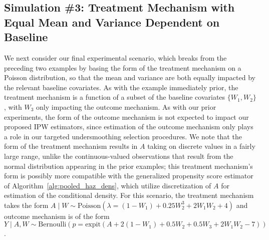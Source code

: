 \subsection{Simulation \#3: Treatment Mechanism with Equal Mean and Variance
Dependent on Baseline}\label{hese_sim_poisson}

We next consider our final experimental scenario, which breaks from the
preceding two examples by basing the form of the treatment mechanism on
a Poisson distribution, so that the mean and variance are both equally impacted
by the relevant baseline covariates. As with the example immediately prior, the
treatment mechanism is a function of a subset of the baseline covariates
$\{W_1, W_2\}$, with $W_3$ only impacting the outcome mechanism. As with our
prior experiments, the form of the outcome mechanism is not expected to impact
our proposed IPW estimators, since estimation of the outcome mechanism only
plays a role in our targeted undersmoothing selection procedures. We note that
the form of the treatment mechanism results in $A$ taking on discrete values in
a fairly large range, unlike the continuous-valued observations that result from
the normal distribution appearing in the prior examples; this treatment
mechanism's form is possibly more compatible with the generalized propensity
score estimator of Algorithm~\ref{alg:pooled_haz_dens}, which utilize
discretization of $A$ for estimation of the conditional density. For this
scenario, the treatment mechanism takes the form $A \mid W \sim
\text{Poisson}\left(\lambda = (1 - W_1) + 0.25 W_2^3 + 2 W_1 W_2 + 4\right)$ and
outcome mechanism is of the form $Y \mid A, W \sim \text{Bernoulli}\left(p
= \text{expit}(A + 2 (1 - W_1) + 0.5 W_2 + 0.5 W_3 + 2 W_1 W_2 - 7)\right)$.

